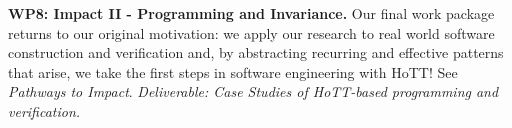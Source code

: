\documentclass[a4paper,11pt]{article}
\begin{document}




{\bf WP8: Impact II - Programming and Invariance.} %
Our final work package returns to our original motivation:
we apply our research to real world software construction and
verification and, by abstracting recurring and effective patterns that
arise, we take the first steps in software engineering with HoTT! See {\em Pathways to
  Impact}. {\em Deliverable: Case Studies of HoTT-based programming
  and verification. 
}
\end{document}
